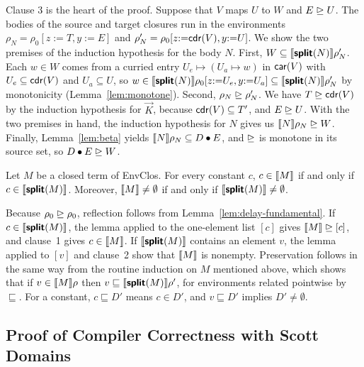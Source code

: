 Clause 3 is the heart of the proof. Suppose that $V$ maps $U$ to $W$
and $E \mathrel{\trianglerighteq} U$. The bodies of the source and target closures run in
the environments $\rho_N = \rho_0[z{:=}T, y{:=}E]$ and
$\rho'_N = \rho_0[z{:=}\mathsf{cdr}(V), y{:=}U]$. We show the two premises of
the induction hypothesis for the body $N$.
First, $W \subseteq \llbracket \textsf{\bfseries split}(N) \rrbracket\rho'_N$. Each $w \in W$ comes
from a curried entry $U_e \mapsto (U_a \mapsto w)$ in $\mathsf{car}(V)$ with
$U_e \subseteq \mathsf{cdr}(V)$ and $U_a \subseteq U$, so
$w \in \llbracket \textsf{\bfseries split}(N) \rrbracket\rho_0[z{:=}U_e, y{:=}U_a]
\subseteq \llbracket \textsf{\bfseries split}(N) \rrbracket\rho'_N$ by monotonicity
(Lemma~\ref{lem:monotone}).
Second, $\rho_N \mathrel{\trianglerighteq} \rho'_N$. We have $T \mathrel{\trianglerighteq} \mathsf{cdr}(V)$ by the induction
hypothesis for $\vec{K}$, because $\mathsf{cdr}(V) \subseteq T'$, and
$E \mathrel{\trianglerighteq} U$.
With the two premises in hand, the induction hypothesis for $N$
gives us $\llbracket N \rrbracket\rho_N \mathrel{\trianglerighteq} W$.
Finally, Lemma~\ref{lem:beta} yields $\llbracket N \rrbracket\rho_N \subseteq D \mathbin{\bullet} E$,
and ${\mathrel{\trianglerighteq}}$ is monotone in its source set, so $D \mathbin{\bullet} E \mathrel{\trianglerighteq} W$.

\begin{lemma}\label{lem:delay}
Let $M$ be a closed term of EnvClos. For every constant $c$,
$c \in \llbracket M \rrbracket$ if and only if $c \in \llbracket \textsf{\bfseries split}(M) \rrbracket$.
Moreover, $\llbracket M \rrbracket \neq \emptyset$ if and only if
$\llbracket \textsf{\bfseries split}(M) \rrbracket \neq \emptyset$.
\end{lemma}

Because $\rho_0 \mathrel{\trianglerighteq} \rho_0$, reflection follows from
Lemma~\ref{lem:delay-fundamental}. If $c \in \llbracket \textsf{\bfseries split}(M) \rrbracket$,
the lemma applied to the one-element list $[c]$ gives
$\llbracket M \rrbracket \mathrel{\trianglerighteq} [c]$, and clause~1 gives $c \in \llbracket M \rrbracket$. If
$\llbracket \textsf{\bfseries split}(M) \rrbracket$ contains an element $v$, the lemma applied
to $[v]$ and clause~2 show that $\llbracket M \rrbracket$ is nonempty. Preservation
follows in the same way from the routine induction on $M$ mentioned
above, which shows that if $v \in \llbracket M \rrbracket\rho$ then
$v \sqsubseteq \llbracket \textsf{\bfseries split}(M) \rrbracket\rho'$, for environments related
pointwise by ${\sqsubseteq}$. For a constant, $c \sqsubseteq D'$ means
$c \in D'$, and $v \sqsubseteq D'$ implies $D' \neq \emptyset$.

\subsection{Proof of Compiler Correctness with Scott Domains}
\label{sec:scott-delay}

